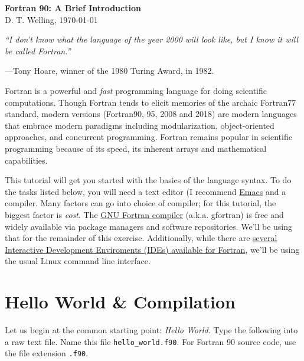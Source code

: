 \documentclass[11pt, letterpaper]{article}
\begin{document}
\setlength{\pdfpageheight}{\paperheight}
\setlength{\pdfpagewidth}{\paperwidth}

\begin{center}
  {\LARGE \textbf{Fortran 90: A Brief Introduction}\\}
  {\large D. T. Welling, \today}
\end{center}

\vspace{0.5cm}
\begin{center}
  \emph{“I don't know what the language of the year 2000 will look like, but I know it will be called Fortran.”}

    —Tony Hoare, winner of the 1980 Turing Award, in 1982.
\end{center}
\vspace{0.5cm}

Fortran is a powerful and \emph{fast} programming language for doing
scientific computations.
Though Fortran tends to elicit memories of the archaic Fortran77 standard, 
modern versions (Fortran90, 95, 2008 and 2018) are modern languages
that embrace modern paradigms including modularization, object-oriented
approaches, and concurrent programming.  Fortran remains popular in scientific
programming because of its speed, its inherent arrays and mathematical
capabilities.  

This tutorial will get you started with the basics
of the language syntax.  To do the tasks listed below, you will need a
text editor (I recommend \href{https://www.gnu.org/software/emacs/}{Emacs}
and a compiler.  Many factors can go into choice of compiler; for this
tutorial, the biggest factor is \emph{cost}.  The
\href{https://gcc.gnu.org/fortran/}{GNU Fortran compiler} (a.k.a. gfortran)
is free and widely available via package managers and software repositories.
We'll be using that for the remainder of this exercise.  Additionally,
while there are \href{https://www.google.com/search?q=fortran+ide&oq=fortran+ide&aqs=chrome..69i57j0l6j0i20i263.1596j0j4&sourceid=chrome&ie=UTF-8}
  {several Interactive Development Enviroments (IDEs) available
    for Fortran}, we'll be using the usual Linux command line interface.

\section{Hello World \& Compilation}

Let us begin at the common starting point: \emph{Hello World}.  Type the
following into a raw text file.  Name this file \texttt{hello\_world.f90}.
For Fortran 90 source code, use the file extension \texttt{.f90}.
\end{document}
